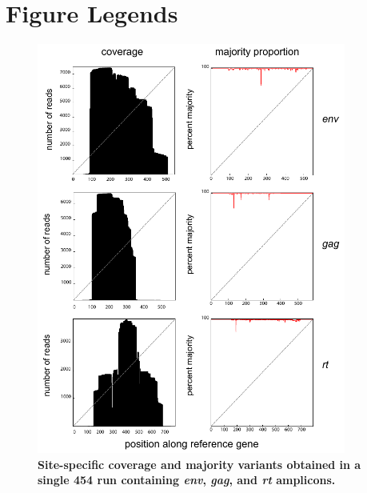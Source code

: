 \documentclass[10pt]{article}
\begin{document}
\section*{Figure Legends}
\begin{figure}[!ht]
\begin{center}
\includegraphics[width=4in]{figures/coverage.pdf}
\end{center}
\caption{
{\bf Site-specific coverage and majority variants obtained in a single 454 run containing \textit{env}, \textit{gag}, and \textit{rt} amplicons.}
}
\label{coverageFig}
\end{figure}
\end{document}
